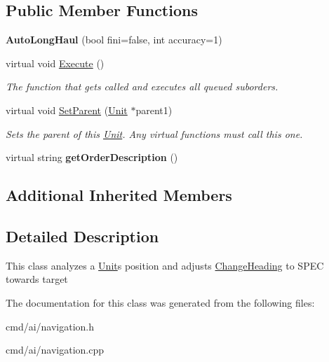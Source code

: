\subsection*{Public Member Functions}
\begin{DoxyCompactItemize}
\item 
{\bfseries Auto\+Long\+Haul} (bool fini=false, int accuracy=1)\hypertarget{classOrders_1_1AutoLongHaul_aafb884853e27f54b971f2ed903eb17a4}{}\label{classOrders_1_1AutoLongHaul_aafb884853e27f54b971f2ed903eb17a4}

\item 
virtual void \hyperlink{classOrders_1_1AutoLongHaul_a007071f7371f23cdccecac32728ff746}{Execute} ()\hypertarget{classOrders_1_1AutoLongHaul_a007071f7371f23cdccecac32728ff746}{}\label{classOrders_1_1AutoLongHaul_a007071f7371f23cdccecac32728ff746}

\begin{DoxyCompactList}\small\item\em The function that gets called and executes all queued suborders. \end{DoxyCompactList}\item 
virtual void \hyperlink{classOrders_1_1AutoLongHaul_a8c331258bcc8e57544ab8128def61b02}{Set\+Parent} (\hyperlink{classUnit}{Unit} $\ast$parent1)\hypertarget{classOrders_1_1AutoLongHaul_a8c331258bcc8e57544ab8128def61b02}{}\label{classOrders_1_1AutoLongHaul_a8c331258bcc8e57544ab8128def61b02}

\begin{DoxyCompactList}\small\item\em Sets the parent of this \hyperlink{classUnit}{Unit}. Any virtual functions must call this one. \end{DoxyCompactList}\item 
virtual string {\bfseries get\+Order\+Description} ()\hypertarget{classOrders_1_1AutoLongHaul_ad2f091025fb92b61d6a8126aaefdc135}{}\label{classOrders_1_1AutoLongHaul_ad2f091025fb92b61d6a8126aaefdc135}

\end{DoxyCompactItemize}
\subsection*{Additional Inherited Members}


\subsection{Detailed Description}
This class analyzes a \hyperlink{classUnit}{Unit}\textquotesingle{}s position and adjusts \hyperlink{classOrders_1_1ChangeHeading}{Change\+Heading} to S\+P\+EC towards target 

The documentation for this class was generated from the following files\+:\begin{DoxyCompactItemize}
\item 
cmd/ai/navigation.\+h\item 
cmd/ai/navigation.\+cpp\end{DoxyCompactItemize}

